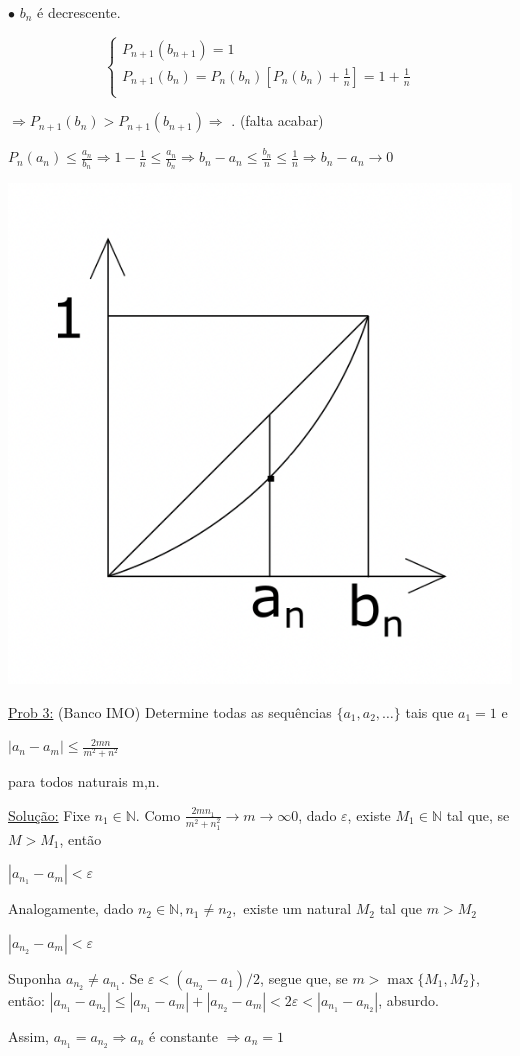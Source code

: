 \documentclass[a4paper,12pt]{article}
\renewcommand{\epsilon}{\ensuremath{\varepsilon}}
\renewcommand{\leq}{\ensuremath{\leqslant}}
\theoremstyle{plain} %
\theoremstyle{definition} %
\theoremstyle{remark} %
\begin{document}
\begin{framed}
		$\bullet$ \hspace{1em} $b_n$ \'e decrescente.
		
		\begin{equation*}
			\begin{cases}
				P_{n+1}(b_{n+1})=1 \\
				P_{n+1}(b_n)=P_{n}(b_{n})[P_{n}(b_{n})+\frac{1}{n}]=1+\frac{1}{n} \\
			\end{cases}
		\end{equation*} 
		
		$\Rightarrow P_{n+1}(b_{n})>P_{n+1}(b_{n+1})\Rightarrow$ . (falta acabar)
		
		$P_n(a_n)\leq \frac{a_n}{b_n}\Rightarrow 1-\frac{1}{n}\leq \frac{a_n}{b_n}\Rightarrow b_n-a_n \leq\frac{b_n}{n}\leq \frac{1}{n}\Rightarrow b_n-a_n\rightarrow 0$ \tiny\textblock
		
		\normalsize
		
		\includegraphics[height=23ex]{1 page 22.png}
	\end{framed}
	
	\vspace{2ex}\underline{Prob 3:} (Banco IMO) Determine todas as sequ\^encias $\{a_1, a_2, \dotso\}$ tais que $a_1=1$ e
	
	\begin{center}
		$|a_n-a_m|\leq \frac{2mn}{m^2+n^2}$
	\end{center}
	
	para todos naturais m,n.
	
	\begin{framed}
		\underline{Solu\c{c}\~ao:} Fixe $n_1\in \mathds{N}$. Como $\frac{2mn_1}{m^2+n_1^2} \rightarrow{m\rightarrow\infty}0$, dado $\epsilon$, existe $M_1\in \mathds{N}$ tal que, se $M>M_1$, ent\~ao 
		
		\begin{center}
			$|a_{n_1}-a_m|<\epsilon$ 
		\end{center}
		
		Analogamente, dado $n_2\in\mathds{N}, n_1\neq n_2,$ existe um natural $M_2$ tal que $m>M_2$
		
		\begin{center}
			$|a_{n_2}-a_m|<\epsilon$ 
		\end{center}
		
		Suponha $a_{n_2}\neq a_{n_1}$. Se $\epsilon<(a_{n_2}-a_1)/2$, segue que, se $m>\max\{M_1, M_2\}$, ent\~ao: $|a_{n_1}- a_{n_2}|\leq |a_{n_1}- a_{m}|+|a_{n_2}- a_{m}|<2\epsilon<|a_{n_1}-a_{n_2}|$, absurdo.
		
		Assim, $a_{n_1}=a_{n_2}\Rightarrow a_n$ \'e constante $\Rightarrow a_n=1$ \tiny\textblock
		
		\normalsize
	\end{framed}
	
\end{document}
